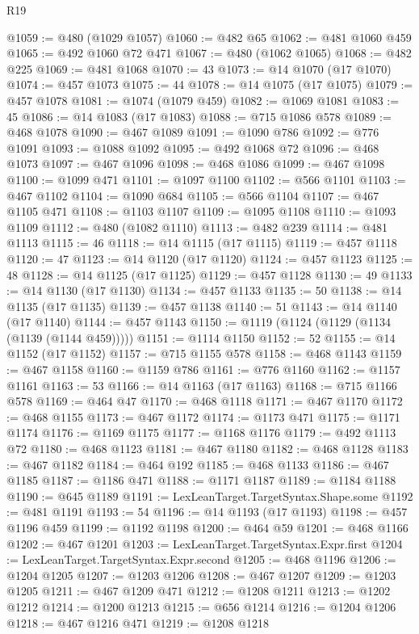 \begin{lexlean}{R19}
\begin{coremodule}
@1059 := @480 (@1029 @1057)
@1060 := @482 @65
@1062 := @481 @1060 @459
@1065 := @492 @1060 @72 @471
@1067 := @480 (@1062 @1065)
@1068 := @482 @225
@1069 := @481 @1068
@1070 := 43
@1073 := @14 @1070 (@17 @1070)
@1074 := @457 @1073
@1075 := 44
@1078 := @14 @1075 (@17 @1075)
@1079 := @457 @1078
@1081 := @1074 (@1079 @459)
@1082 := @1069 @1081
@1083 := 45
@1086 := @14 @1083 (@17 @1083)
@1088 := @715 @1086 @578
@1089 := @468 @1078
@1090 := @467 @1089
@1091 := @1090 @786
@1092 := @776 @1091
@1093 := @1088 @1092
@1095 := @492 @1068 @72
@1096 := @468 @1073
@1097 := @467 @1096
@1098 := @468 @1086
@1099 := @467 @1098
@1100 := @1099 @471
@1101 := @1097 @1100
@1102 := @566 @1101
@1103 := @467 @1102
@1104 := @1090 @684
@1105 := @566 @1104
@1107 := @467 @1105 @471
@1108 := @1103 @1107
@1109 := @1095 @1108
@1110 := @1093 @1109
@1112 := @480 (@1082 @1110)
@1113 := @482 @239
@1114 := @481 @1113
@1115 := 46
@1118 := @14 @1115 (@17 @1115)
@1119 := @457 @1118
@1120 := 47
@1123 := @14 @1120 (@17 @1120)
@1124 := @457 @1123
@1125 := 48
@1128 := @14 @1125 (@17 @1125)
@1129 := @457 @1128
@1130 := 49
@1133 := @14 @1130 (@17 @1130)
@1134 := @457 @1133
@1135 := 50
@1138 := @14 @1135 (@17 @1135)
@1139 := @457 @1138
@1140 := 51
@1143 := @14 @1140 (@17 @1140)
@1144 := @457 @1143
@1150 := @1119 (@1124 (@1129 (@1134 (@1139 (@1144 @459)))))
@1151 := @1114 @1150
@1152 := 52
@1155 := @14 @1152 (@17 @1152)
@1157 := @715 @1155 @578
@1158 := @468 @1143
@1159 := @467 @1158
@1160 := @1159 @786
@1161 := @776 @1160
@1162 := @1157 @1161
@1163 := 53
@1166 := @14 @1163 (@17 @1163)
@1168 := @715 @1166 @578
@1169 := @464 @47
@1170 := @468 @1118
@1171 := @467 @1170
@1172 := @468 @1155
@1173 := @467 @1172
@1174 := @1173 @471
@1175 := @1171 @1174
@1176 := @1169 @1175
@1177 := @1168 @1176
@1179 := @492 @1113 @72
@1180 := @468 @1123
@1181 := @467 @1180
@1182 := @468 @1128
@1183 := @467 @1182
@1184 := @464 @192
@1185 := @468 @1133
@1186 := @467 @1185
@1187 := @1186 @471
@1188 := @1171 @1187
@1189 := @1184 @1188
@1190 := @645 @1189
@1191 := LexLeanTarget.TargetSyntax.Shape.some
@1192 := @481 @1191
@1193 := 54
@1196 := @14 @1193 (@17 @1193)
@1198 := @457 @1196 @459
@1199 := @1192 @1198
@1200 := @464 @59
@1201 := @468 @1166
@1202 := @467 @1201
@1203 := LexLeanTarget.TargetSyntax.Expr.first
@1204 := LexLeanTarget.TargetSyntax.Expr.second
@1205 := @468 @1196
@1206 := @1204 @1205
@1207 := @1203 @1206
@1208 := @467 @1207
@1209 := @1203 @1205
@1211 := @467 @1209 @471
@1212 := @1208 @1211
@1213 := @1202 @1212
@1214 := @1200 @1213
@1215 := @656 @1214
@1216 := @1204 @1206
@1218 := @467 @1216 @471
@1219 := @1208 @1218

\end{coremodule}
\end{lexlean}

